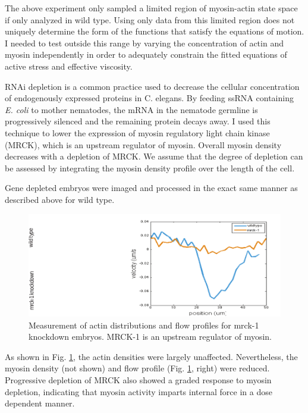 The above experiment only sampled a limited region of myosin-actin state space if only analyzed in wild type.
Using only data from this limited region does not uniquely determine the form of the
functions that satisfy the equations of motion. I needed to test outside this range by varying the
concentration of actin and myosin independently in order to adequately constrain the fitted equations
of active stress and effective viscosity.

RNAi depletion is a common practice used to decrease the cellular concentration of endogenously
expressed proteins in C. elegans. By feeding ssRNA containing \textit{E. coli} to mother nematodes, the
mRNA in the nematode germline is progressively silenced and the remaining protein decays away. I used this technique to lower the expression of myosin regulatory light chain kinase (MRCK), which is an upstream regulator of myosin.
Overall
myosin density decreases with a depletion of MRCK.
We assume that the degree of
depletion can be assessed by integrating the myosin density profile over the length of the cell.

Gene depleted embryos were imaged and processed in the exact same
manner as described above for wild type.

\begin{figure}[h!]
	\centering
	\includegraphics[width=\hsize]{data/flow_mrck_kd.pdf}
	\caption{\label{fig:measure_flow_nomyo}  Measurement of actin distributions and flow profiles for mrck-1 knockdown embryos.  MRCK-1 is an upstream regulator of myosin.  }
\end{figure}

As shown in Fig. \ref{fig:measure_flow_nomyo}, the actin densities were largely unaffected.  Nevertheless, the myosin density (not shown) and flow profile (Fig. \ref{fig:measure_flow_nomyo}, right) were reduced.  Progressive depletion of MRCK also showed a graded response to myosin depletion, indicating that myosin activity imparts internal force in a dose dependent manner.

